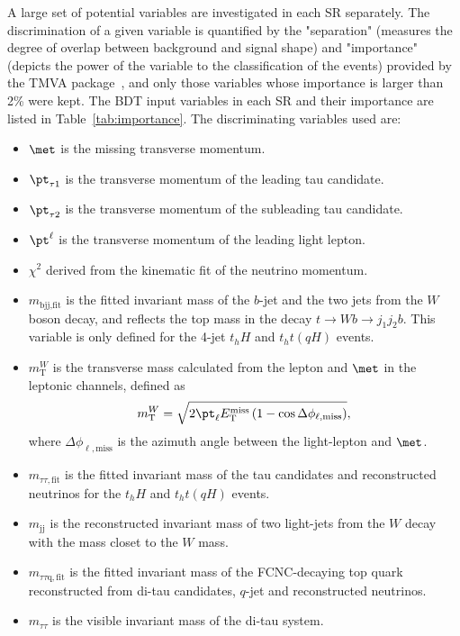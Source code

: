 A large set of potential variables are investigated in each SR separately. The discrimination of a given variable is quantified by the "separation" (measures the degree of overlap between background and signal shape) and "importance" (depicts the power of the variable to the classification of the events) provided by the TMVA package~\cite{Hocker:2007ht}, and only those variables whose importance is larger than 2\% were kept.
The BDT input variables in each SR and their importance are listed in Table~\ref{tab:importance}. The discriminating variables used are:
\begin{itemize}
\item $\met$ is the missing transverse momentum.
\item ${\pt}_{\tau1} $ is the transverse momentum of the leading tau candidate.
\item ${\pt}_{\tau2}$ is the transverse momentum of the subleading tau candidate.
\item ${\pt}^{\ell}$ is the transverse momentum of the leading light lepton.
\item $\chi^2$ derived from the kinematic fit of the neutrino momentum.
\item $m_{\text{bjj},\text{fit}}$ is the fitted invariant mass of the $b$-jet and the two jets from the $W$ boson decay, and reflects the top mass in the decay $t\to Wb \to j_1j_2b$. This variable is only defined for the 4-jet $t_hH$ and $t_ht(qH)$ events.
\item $m^{W}_{\text{T}}$ is the transverse mass calculated from the lepton and $\met$ in the leptonic channels, defined as
\begin{equation}
m^{W}_{\text{T}} = \sqrt{2 {\pt}_{\ell} E_{\text{T}}^{\text{miss}} \left(1-\cos\Delta\phi_{\ell,\text{miss}} \right)},  
\end{equation}
where $\Delta\phi_{\ell,\text{miss}}$ is the azimuth angle between the light-lepton and $\met$.  
\item $m_{\tau\tau,\text{fit}}$ is the fitted invariant mass of the tau candidates and reconstructed neutrinos for the $t_hH$ and $t_ht(qH)$ events. 
\item $m_{\text{jj}}$ is the reconstructed invariant mass of two light-jets from the $W$ decay with the mass closet to the $W$ mass.
\item $m_{\tau\tau\text{q},\text{fit}}$ is the fitted invariant mass of the FCNC-decaying top quark reconstructed from di-tau candidates, $q$-jet and reconstructed neutrinos.
\item $m_{\tau\tau}$ is the visible invariant mass of the di-tau system. %

\end{itemize}
